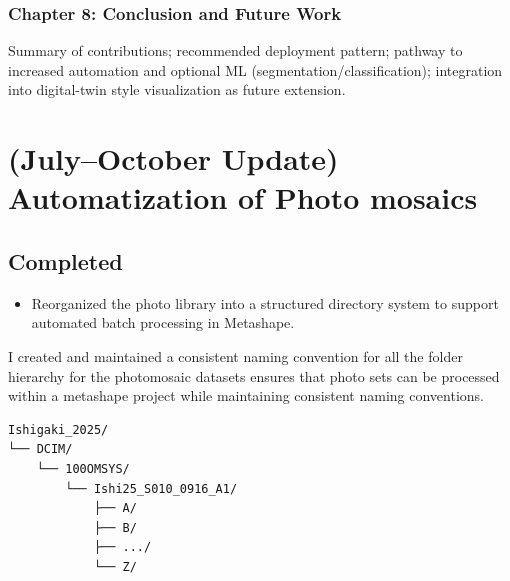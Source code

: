 \documentclass[a4paper,12pt]{article}
\begin{document}
\subsubsection*{Chapter 8: Conclusion and Future Work}
Summary of contributions; recommended deployment pattern; pathway to increased automation and optional ML (segmentation/classification); integration into digital-twin style visualization as future extension.
\newpage



\section{(July--October Update) Automatization of Photo mosaics}


\subsection{Completed}
\begin{itemize}
    \item Reorganized the photo library into a structured directory system to support automated batch processing in Metashape.
\end{itemize}

\begin{tcolorbox}[title=Folder Structure]
I created and maintained a consistent naming convention for all the folder hierarchy for the photomosaic datasets ensures that photo sets can be processed within a metashape project while maintaining consistent naming conventions.
\begin{verbatim}
Ishigaki_2025/
└── DCIM/
    └── 100OMSYS/
        └── Ishi25_S010_0916_A1/
            ├── A/
            ├── B/
            ├── .../
            └── Z/
\end{verbatim}
\end{tcolorbox}
\end{document}
